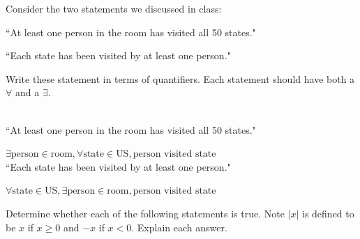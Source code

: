 \documentclass[12 pt]{exam}
\begin{document}
\begin{questions}
\begin{parts}
\end{parts}


\question Consider the two statements we discussed in class:

``At least one person in the room has visited all 50 states."

``Each state has been visited by at least one person."

Write these statement in terms of quantifiers. Each statement should have both a $\forall$  and a $\exists$.
\begin{solution}\\
``At least one person in the room has visited all 50 states."

$\exists \text{person} \in \text{room}, \forall \text{state} \in \text{US}, \text{person visited state}$ \\

``Each state has been visited by at least one person."

$\forall \text{state} \in \text{US}, \exists \text{person} \in \text{room}, \text{person visited state}$ \\

\end{solution}


\question Determine whether each of the following statements is true.  Note $|x|$ is defined to be $x$ if $x \geq 0$ and $-x$ if $x < 0$. Explain each answer.


\end{questions}
\end{document}

